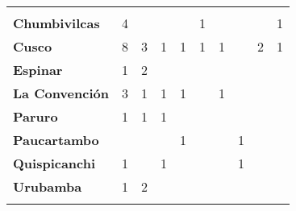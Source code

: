 \begin{tabular}{lccccccccc}
	&\cellcolor[HTML]{FCC46C}\\
	\textbf{Chumbivilcas}                      			
	&4											&\cellcolor[HTML]{FCC46C}
	&\cellcolor[HTML]{FCC46C}					&\cellcolor[HTML]{FCC46C}
	&1											&\cellcolor[HTML]{FCC46C}
	&\cellcolor[HTML]{FCC46C}					&\cellcolor[HTML]{FCC46C}
	&1\\
	\textbf{Cusco}                            							
	&8											&3
	&1											&1
	&1											&1
	&\cellcolor[HTML]{FCC46C}					&2
	&1\\
	\textbf{Espinar}       					             								
	&1
	&2											&\cellcolor[HTML]{FCC46C}	
	&\cellcolor[HTML]{FCC46C} 					&\cellcolor[HTML]{FCC46C}
	&\cellcolor[HTML]{FCC46C}					&\cellcolor[HTML]{FCC46C}
	&\cellcolor[HTML]{FCC46C}					&\cellcolor[HTML]{FCC46C}\\
	\textbf{La Convención}                      					
	&3
	&1 											&1 
	&1											&\cellcolor[HTML]{FCC46C}
	&1											&\cellcolor[HTML]{FCC46C}
	&\cellcolor[HTML]{FCC46C}					&\cellcolor[HTML]{FCC46C}\\
	\textbf{Paruro}                            					
	&1
	&1											&1
	&\cellcolor[HTML]{FCC46C}					&\cellcolor[HTML]{FCC46C}
	&\cellcolor[HTML]{FCC46C}					&\cellcolor[HTML]{FCC46C}
	&\cellcolor[HTML]{FCC46C}					&\cellcolor[HTML]{FCC46C}\\
	\textbf{Paucartambo}               		                       			
	&\cellcolor[HTML]{FCC46C}
	&\cellcolor[HTML]{FCC46C}					&\cellcolor[HTML]{FCC46C}
	&1											&\cellcolor[HTML]{FCC46C}
	&\cellcolor[HTML]{FCC46C}					&1
	&\cellcolor[HTML]{FCC46C}					&\cellcolor[HTML]{FCC46C}\\
	\textbf{Quispicanchi}                                         	      	
	&1											&\cellcolor[HTML]{FCC46C}
	&1											&\cellcolor[HTML]{FCC46C}
	&\cellcolor[HTML]{FCC46C}					&\cellcolor[HTML]{FCC46C}
	&1											&\cellcolor[HTML]{FCC46C}
	&\cellcolor[HTML]{FCC46C}\\
	\textbf{Urubamba}                                                      	
	&1
	&2											&\cellcolor[HTML]{FCC46C}
	&\cellcolor[HTML]{FCC46C}					&\cellcolor[HTML]{FCC46C}
	&\cellcolor[HTML]{FCC46C} 					&\cellcolor[HTML]{FCC46C}
	&\cellcolor[HTML]{FCC46C}					&\cellcolor[HTML]{FCC46C}\\	
	&\multicolumn{1}{l}{}                       &\multicolumn{1}{l}{}            &\multicolumn{1}{l}{}                         
	&\multicolumn{1}{l}{}                       &\multicolumn{1}{l}{}            &\multicolumn{1}{l}{}                       &\multicolumn{1}{l}{}                       &\multicolumn{1}{l}{}            &\multicolumn{1}{l}{}    
\end{tabular}
